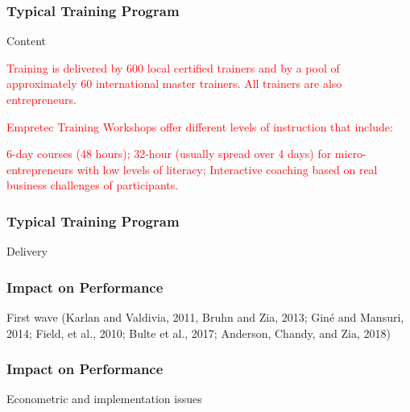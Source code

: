 \documentclass[hideothersubsections, usenames,dvipsnames,11pt]{beamer}
\newenvironment{itemize_2pt}{\itemize\addtolength{\itemsep}{2pt}}{\enditemize}
\begin{document}

\begin{frame}
\frametitle{Typical Training Program}
	Content
	\begin{itemize_2pt}
	\item \textcolor{red}{Training is delivered by 600 local certified trainers and by a pool of approximately 60 international master trainers. All trainers are also entrepreneurs.
	\item Empretec Training Workshops offer different levels of instruction that include:
	\item 6-day courses (48 hours); 32-hour (usually spread over 4 days) for micro-entrepreneurs with low levels of literacy; Interactive coaching based on real business challenges of participants.}
	\end{itemize_2pt}
\end{frame}

\begin{frame}
\frametitle{Typical Training Program}
	Delivery 
	\begin{itemize_2pt}
	\item %
	\vspace{0.1in}
	\end{itemize_2pt}
\end{frame}


\begin{frame}
\frametitle{Impact on Performance}
	\begin{itemize_2pt}
	\item First wave (Karlan and Valdivia, 2011, Bruhn and Zia, 2013; Giné and Mansuri, 2014; Field, et al., 2010; Bulte et al., 2017; Anderson, Chandy, and Zia, 2018)
					 \citep{Karlan2011} \citep{Field2010} \citet{Gine2014} \citep{Bruhn2013} \citep{Bulte2017} \citep{Anderson2018}
	\vspace{0.1in}
	\end{itemize_2pt}
\end{frame}

\begin{frame}
\frametitle{Impact on Performance}
	\begin{itemize_2pt}
	\item Econometric and implementation issues \citep{McKenzie2014}
	\vspace{0.1in}
	\end{itemize_2pt}
\end{frame}
\end{document}
